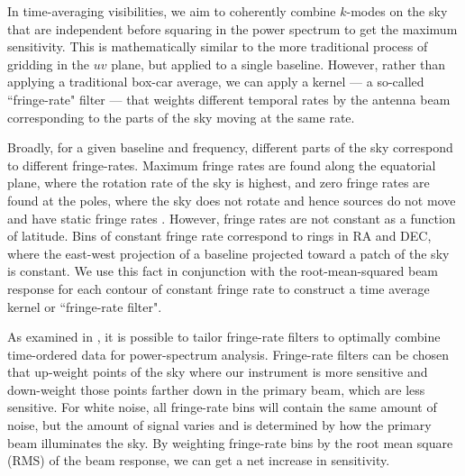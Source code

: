 \documentclass[twocolumn,numberedappendix]{emulateapj} \shorttitle{New Limits on the 21 cm Power Spectrum at $z=8.4$}
\begin{document}
In time-averaging visibilities, we aim to coherently combine  $k$-modes on the
sky that are independent  before squaring in the power spectrum to get the
maximum sensitivity. This is mathematically similar to the more traditional
process of gridding in the $uv$ plane, but applied to a single baseline.
However, rather than applying a traditional box-car average, we can apply a
kernel --- a so-called ``fringe-rate" filter --- that weights different temporal
rates by the antenna beam corresponding to the parts of the sky moving at the
same rate.

Broadly, for a given baseline and frequency, different parts of the sky
correspond to different fringe-rates.  Maximum fringe rates are found along the
equatorial plane, where the rotation rate of the sky is highest, and zero
fringe rates are found at the poles, where the sky does not rotate and hence
sources do not move and have static fringe rates \citep{parsons_backer2009}.
However, fringe rates are not constant as a function of latitude. Bins of
constant fringe rate correspond to rings in RA and DEC, where the east-west
projection of a baseline projected toward a patch of the sky is constant.  We
use this fact in conjunction with the root-mean-squared beam response for each
contour of constant fringe rate to construct a time average kernel or
``fringe-rate filter".


%

As examined in \citet{parsons_et_al2015}, it is possible to tailor fringe-rate filters
to optimally combine time-ordered data for power-spectrum analysis.
Fringe-rate filters can be chosen that
up-weight points of the sky where our instrument is more sensitive and down-weight
those points farther down in the primary beam, which are less sensitive.
For white noise,
all fringe-rate bins will contain the same amount of noise, but the amount of signal
varies and is determined by how the primary beam illuminates the sky.
By weighting fringe-rate
bins by the root mean square (RMS) of the beam response, we can get a net increase in sensitivity.  
\end{document}
